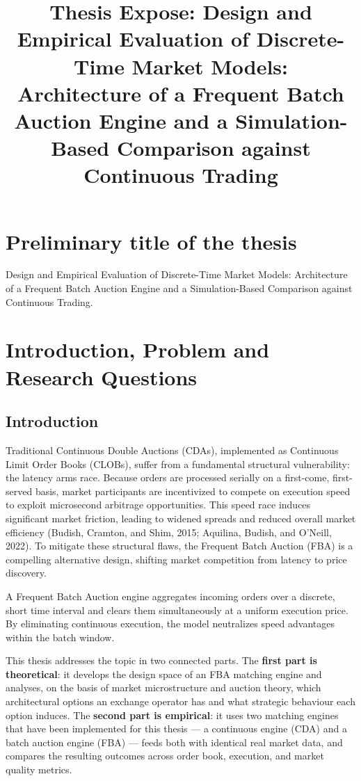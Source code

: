 \documentclass[11pt]{article}
\title{Thesis Expose: Design and Empirical Evaluation of Discrete-Time Market Models:\\ Architecture of a Frequent Batch Auction Engine and a Simulation-Based Comparison against Continuous Trading}
\author{}
\date{}
\begin{document}
\maketitle


\section{Preliminary title of the thesis}
Design and Empirical Evaluation of Discrete-Time Market Models: Architecture of a Frequent Batch Auction Engine and a Simulation-Based Comparison against Continuous Trading.


\section{Introduction, Problem and Research Questions}

\subsection{Introduction}

Traditional Continuous Double Auctions (CDAs), implemented as Continuous Limit Order Books (CLOBs), suffer from a fundamental structural vulnerability: the latency arms race. Because orders are processed serially on a first-come, first-served basis, market participants are incentivized to compete on execution speed to exploit microsecond arbitrage opportunities. This speed race induces significant market friction, leading to widened spreads and reduced overall market efficiency (Budish, Cramton, and Shim, 2015; Aquilina, Budish, and O'Neill, 2022). To mitigate these structural flaws, the Frequent Batch Auction (FBA) is a compelling alternative design, shifting market competition from latency to price discovery.

A Frequent Batch Auction engine aggregates incoming orders over a discrete, short time interval and clears them simultaneously at a uniform execution price. By eliminating continuous execution, the model neutralizes speed advantages within the batch window.

This thesis addresses the topic in two connected parts. The \textbf{first part is theoretical}: it develops the design space of an FBA matching engine and analyses, on the basis of market microstructure and auction theory, which architectural options an exchange operator has and what strategic behaviour each option induces. The \textbf{second part is empirical}: it uses two matching engines that have been implemented for this thesis --- a continuous engine (CDA) and a batch auction engine (FBA) --- feeds both with identical real market data, and compares the resulting outcomes across order book, execution, and market quality metrics.
\end{document}
